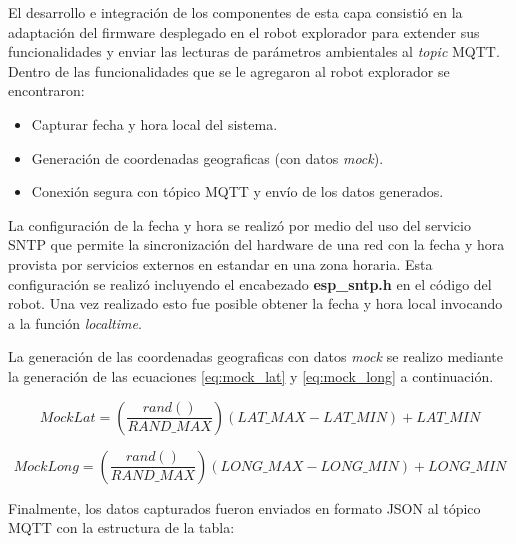 El desarrollo e integración de los componentes de esta capa consistió en la adaptación del firmware desplegado en el robot explorador para extender sus funcionalidades y enviar las lecturas de parámetros ambientales al \textit{topic} MQTT. Dentro de las funcionalidades que se le agregaron al robot explorador se encontraron:

\begin{itemize}
	\item Capturar fecha y hora local del sistema.
	\item Generación de coordenadas geograficas (con datos \textit{mock}).
	\item Conexión segura con tópico MQTT y envío de los datos generados.	
		
\end{itemize}

La configuración de la fecha y hora se realizó por medio del uso del servicio SNTP \citep{sntp} que permite la sincronización del hardware de una red con la fecha y hora provista por servicios externos en estandar en una zona horaria. Esta configuración se realizó incluyendo el encabezado \textbf{esp\_sntp.h} en el código del robot. Una vez realizado esto fue posible obtener la fecha y hora local invocando a la función \textit{localtime}.

La generación de las coordenadas geograficas con datos \textit{mock} se realizo mediante la generación de las ecuaciones \ref{eq:mock_lat} y \ref{eq:mock_long} a continuación.

\begin{equation}
	\label{eq:mock_lat}
	MockLat = \left( \frac{rand()}{RAND\_MAX} \right) \left( LAT\_MAX - LAT\_MIN \right) + LAT\_MIN
\end{equation}
                
\begin{equation}
	\label{eq:mock_long}
	MockLong = \left( \frac{rand()}{RAND\_MAX} \right) \left( LONG\_MAX - LONG\_MIN \right) + LONG\_MIN
\end{equation}

Finalmente, los datos capturados fueron enviados en formato JSON al tópico MQTT con la estructura de la tabla:


